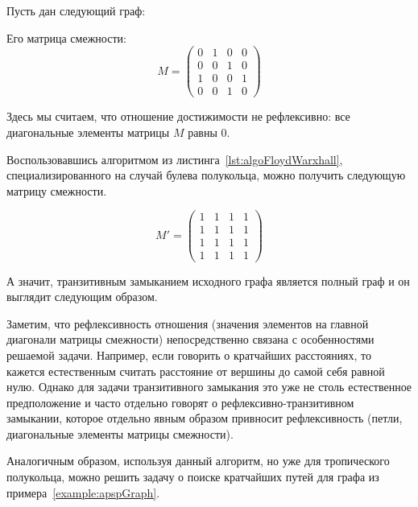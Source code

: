 \begin{example}\label{exmpl:transitiveClosure}
  Пусть дан следующий граф:
  \begin{center}
    
  \end{center}

  Его матрица смежности:
  $$ M =
  \begin{pmatrix}
    0 & 1 & 0 & 0 \\
    0 & 0 & 1 & 0 \\
    1 & 0 & 0 & 1 \\
    0 & 0 & 1 & 0
  \end{pmatrix}
  $$

  Здесь мы считаем, что отношение достижимости не рефлексивно: все диагональные элементы матрицы $M$ равны 0.

  Воспользовавшись алгоритмом из листинга~\ref{lst:algoFloydWarxhall}, специализированного на случай булева полукольца, можно получить следующую матрицу смежности.

  $$ M' =
  \begin{pmatrix}
    1 & 1 & 1 & 1 \\
    1 & 1 & 1 & 1 \\
    1 & 1 & 1 & 1 \\
    1 & 1 & 1 & 1
  \end{pmatrix}
  $$

  А значит, транзитивным замыканием исходного графа является полный граф и он выглядит следующим образом.

  \begin{center}
    
  \end{center}

\end{example}

Заметим, что рефлексивность отношения (значения элементов на главной диагонали матрицы смежности) непосредственно связана с особенностями решаемой задачи. Например, если говорить о кратчайших расстояниях, то кажется естественным считать расстояние от вершины до самой себя равной нулю. Однако для задачи транзитивного замыкания это уже не столь естественное предположение и часто отдельно говорят о рефлексивно-транзитивном замыкании, которое отдельно явным образом привносит рефлексивность (петли, диагональные элементы матрицы смежности).

Аналогичным образом, используя данный алгоритм, но уже для тропического полукольца, можно решить задачу о поиске кратчайших путей для графа из примера~\ref{example:apspGraph}.

